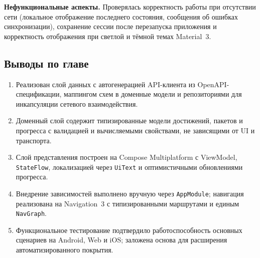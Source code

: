 \documentclass[../main.tex]{subfiles}
\begin{document}
\textbf{Нефункциональные аспекты.} Проверялась корректность работы при отсутствии сети (локальное отображение последнего состояния, сообщения об ошибках синхронизации), сохранение сессии после перезапуска приложения и корректность отображения при светлой и тёмной темах Material~3.

\subsection{Выводы по главе}

\begin{enumerate}[leftmargin=*]
	\item Реализован слой данных с автогенерацией API-клиента из OpenAPI-спецификации, маппингом схем в доменные модели и репозиториями для инкапсуляции сетевого взаимодействия.
	\item Доменный слой содержит типизированные модели достижений, пакетов и прогресса с валидацией и вычисляемыми свойствами, не зависящими от UI и транспорта.
	\item Слой представления построен на Compose Multiplatform с ViewModel, \texttt{StateFlow}, локализацией через \texttt{UiText} и оптимистичными обновлениями прогресса.
	\item Внедрение зависимостей выполнено вручную через \texttt{AppModule}; навигация реализована на Navigation~3 с типизированными маршрутами и единым \texttt{NavGraph}.
	\item Функциональное тестирование подтвердило работоспособность основных сценариев на Android, Web и iOS; заложена основа для расширения автоматизированного покрытия.
\end{enumerate}
\end{document}
